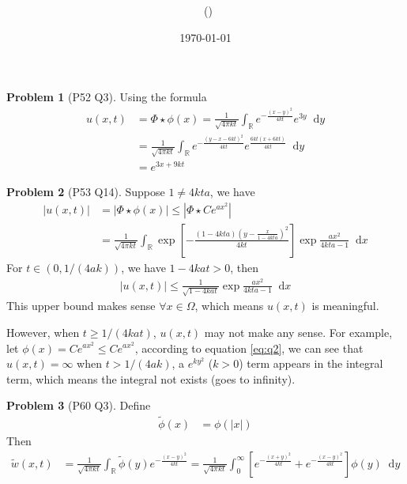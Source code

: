 \documentclass[twoside,11pt]{article}
\title{{\sffamily \Code \ \Ass}}
\author{\sffamily \name \ (\href{mailto:\mail}{\mail})}
\date{\sffamily \today}
\makeatletter
\newcommand{\R}{\mathbb{R}}
\renewcommand*\d{\mathop{}\!\mathrm{d}}
\theoremstyle{definition}
\newtheorem{problem}{Problem}
\theoremstyle{remark}
\newtheorem*{remark}{Remark}
\renewcommand{\maketitle}{\bgroup\setlength{\parindent}{0pt}
\begin{flushleft}
  \textbf{\Large\@title}

  \@author
\end{flushleft}\egroup
}
\makeatother
\begin{document}
\maketitle
\thispagestyle{title}


\begin{problem}[P52 Q3]
Using the formula
\begin{align*}
    u(x,t) &= \Phi\star\phi(x) = \frac{1}{\sqrt{4\pi kt}}\int_\R
    e^{-\frac{(x-y)^2}{4kt}} e^{3y}\d y\\
    &= \frac{1}{\sqrt{4\pi kt}}\int_\R e^{-\frac{(y-x-6kt)^2}{4kt}}
    e^{\frac{6kt(x+6kt)}{4kt}}\d y\\
    &= e^{3x+9kt}
\end{align*}
\end{problem}


\begin{problem}[P53 Q14]
Suppose $1\neq 4kta$, we have
\begin{align}
    |u(x,t)| &= |\Phi\star\phi(x)|\leq |\Phi\star Ce^{ax^2}|\\
    &= \frac{1}{\sqrt{4\pi kt}}\int_\R
    \exp\left[
        -\frac{(1-4kta)(y-\frac{x}{1-4kta})^2}{4kt}
    \right]
    \exp\frac{ax^2}{4kta - 1}\d x
    \label{eq:q2}
\end{align}
For $t\in(0,1/(4ak))$, we have $1-4kat>0$, then
\begin{align*}
    |u(x,t)| \leq \frac{1}{\sqrt{1-4kat}}\exp\frac{ax^2}{4kta - 1}\d x
\end{align*}
This upper bound makes sense $\forall x\in\Omega$, which means
$u(x,t)$ is meaningful.

However, when $t\geq 1/(4kat)$, $u(x,t)$ may not make any sense.
For example, let $\phi(x)=Ce^{ax^2}\leq Ce^{ax^2}$, according to equation \ref{eq:q2},
we can see that $u(x,t)=\infty$ when $t>1/(4ak)$,
a $e^{ky^2}$ ($k>0$) term appears in the integral term, which means
the integral not exists (goes to infinity).
\end{problem}


\begin{problem}[P60 Q3]
Define
\begin{align*}
    \tilde{\phi}(x) &= \phi(|x|)
\end{align*}
Then 
\begin{align*}
    \tilde{w}(x,t) &= \frac{1}{\sqrt{4\pi kt}}\int_\R
    \tilde{\phi}(y)e^{-\frac{(x-y)^2}{4kt}}
    =\frac{1}{\sqrt{4\pi kt}}\int_0^\infty\left[
        e^{-\frac{(x+y)^2}{4kt}}
        +e^{-\frac{(x-y)^2}{4kt}}
    \right]\phi(y) \d y
\end{align*}
\end{problem}
\end{document}
